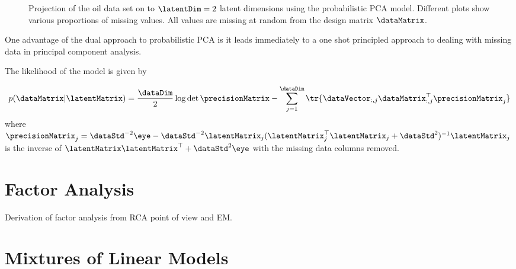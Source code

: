 % 
\begin{figure}
  \hfill{}

  \hfill{}

  \caption{Projection of the oil data set on to $\latentDim=2$ latent
    dimensions using the probabilistic PCA model. Different plots show
    various proportions of missing values. All values are missing at
    random from the design matrix $\dataMatrix$.}

\end{figure}

One advantage of the dual approach to probabilistic PCA is it leads immediately to a one shot principled approach to dealing with missing data in principal component analysis.

The likelihood of the model is given by

\[
p(\dataMatrix|\latentMatrix) = \frac{\dataDim}{2}\log\det{\precisionMatrix} - \sum_{j=1}^\dataDim\tr{\dataVector_{:, j}\dataMatrix_{:, j}^\top\precisionMatrix_j}
\]
where $\precisionMatrix_j = \dataStd^{-2} \eye - \dataStd^{-2}\latentMatrix_j(\latentMatrix_j^\top\latentMatrix_j+\dataStd^{2})^{-1}\latentMatrix_j$ is the inverse of $\latentMatrix\latentMatrix^\top + \dataStd^2\eye$ with the missing data columns removed. 

\section{Factor Analysis}

Derivation of factor analysis from RCA point of view and EM.

\section{Mixtures of Linear Models}

